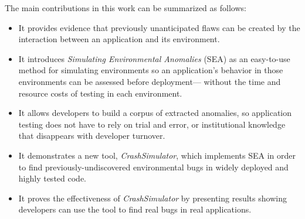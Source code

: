 The main contributions in this work can be summarized as follows:

\begin{itemize}

\item{It provides evidence
that previously unanticipated flaws can be created by the interaction
between an application and its environment.}

\item{It introduces \textit{Simulating Environmental Anomalies} (SEA)
as an easy-to-use method for simulating environments
so an application's behavior in those environments
can be assessed before deployment---
without the time and resource costs of
testing in each environment.}

\item{It allows developers to build a corpus of extracted anomalies, so
    application testing does not have to rely on trial and error,
    or institutional knowledge
    that disappears with developer turnover.}

\item{It demonstrates a new tool, {\em CrashSimulator},
which implements SEA
in order to find previously-undiscovered environmental bugs
in widely deployed and highly tested code.}

\item{It proves the effectiveness
of {\em CrashSimulator}
by presenting results
showing developers
can use the tool to find real bugs in real applications.}

\end{itemize}
